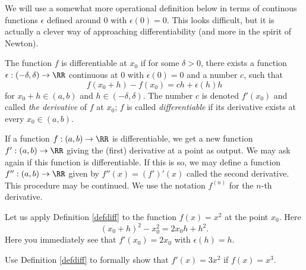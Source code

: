 \documentclass{article}
\begin{document}
We will use a somewhat more operational definition below in terms
of continous functions $\epsilon$ defined around $0$ with
$\epsilon(0) = 0$. This looks difficult, but it is
actually a clever way of approaching differentiability (and more 
in the spirit of Newton).

\begin{definition}[emph]\label{defdiff}
The function $f$ is differentiable at $x_0$ if 
for some $\delta>0$, there exists a function $\epsilon: (-\delta, \delta)
\rightarrow \RR$ continuous at $0$ with $\epsilon(0) = 0$
and a number $c$, such that
\begin{equation}\label{operational}
f(x_0 + h) - f(x_0) = c h + \epsilon(h) h
\end{equation}
for $x_0 + h\in (a, b)$ and $h\in (-\delta, \delta)$. The number
$c$ is denoted $f'(x_0)$ and called \emph{the derivative} of
$f$ at $x_0$; $f$ is called \emph{differentiable} if
its derivative exists at every $x_0\in (a, b)$.
\end{definition}

\begin{remark}[emph]
  If a function $f:(a, b)\rightarrow \RR$ is
  differentiable, we get a new function
  $f':(a, b)\rightarrow \RR$ giving the (first) derivative at
  a point as output. We may ask again if this function
  is differentiable. If this is so, we may define a
  function $f'':(a, b)\rightarrow \RR$ given by
  $f''(x) = (f')'(x)$ called the second derivative. This
  procedure may be continued. We use the notation
  $f^{(n)}$ for the $n$-th derivative.
\end{remark}

\begin{example}
Let us apply Definition \ref{defdiff} to the function $f(x) = x^2$ at
the point $x_0$. Here
$$
(x_0 + h)^2 - x_0^2 = 2 x_0 h + h^2.
$$
Here you immediately see that $f'(x_0) = 2 x_0$ with
$\epsilon(h) = h$.
\end{example}

\beginshex
Use Definition \ref{defdiff} to formally show that $f'(x) = 3 x^2$
if $f(x) = x^3$.
\endshex
\end{document}
